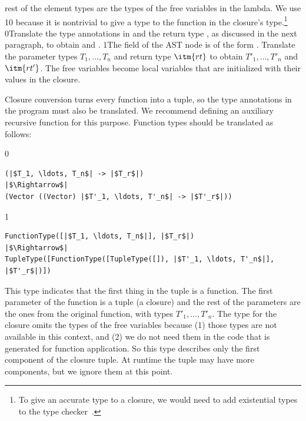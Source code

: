 \documentclass[7x10]{TimesAPriori_MIT}%
\def\racketEd{0}
\def\pythonEd{1}
\providecommand{\BookEdition}{1}
\let\edition\BookEdition
\newcommand{\racket}[1]{{\if\edition\racketEd{#1}\fi}}
\newcommand{\pythonColor}[0]{}
\newcommand{\python}[1]{{\if\edition\pythonEd\pythonColor #1\fi}}
\numberwithin{theorem}{chapter}
\numberwithin{definition}{chapter}
\numberwithin{equation}{chapter}
\begin{document}
rest of the element types are the types of the free variables in the
lambda. We use \python{}\racket{\code{\_}} because it
is nontrivial to give a type to the function in the closure's
type.\footnote{To give an accurate type to a closure, we would need to
  add existential types to the type checker~\citep{Minamide:1996ys}.}
%
\racket{Translate the type
  annotations in  and the return type \itm{rt}, as discussed in
  the next paragraph, to obtain \itm{ps'} and \itm{rt'}.}%
\python{The  field of the  AST node
  is of the form \code{FunctionType([$x_1:T_1,\ldots, x_n:T_n$], $rt$)}.
  Translate the parameter types $T_1,\ldots,T_n$ and return type $\itm{rt}$
  to obtain $T'_1,\ldots, T'_n$ and $\itm{rt'}$.}
The free variables become local variables that are initialized with
their values in the closure.

Closure conversion turns every function into a tuple, so the type
annotations in the program must also be translated.  We recommend
defining an auxiliary recursive function for this purpose.  Function
types should be translated as follows:
%
{\if\edition\racketEd
\begin{lstlisting}
(|$T_1, \ldots, T_n$| -> |$T_r$|)
|$\Rightarrow$|  
(Vector ((Vector) |$T'_1, \ldots, T'_n$| -> |$T'_r$|))
\end{lstlisting}
\fi}
{\if\edition\pythonEd\pythonColor
\begin{lstlisting}
FunctionType([|$T_1, \ldots, T_n$|], |$T_r$|)
|$\Rightarrow$|  
TupleType([FunctionType([TupleType([]), |$T'_1, \ldots, T'_n$|], |$T'_r$|)])
\end{lstlisting}
\fi}
%
This type indicates that the first thing in the tuple is a
function. The first parameter of the function is a tuple (a closure)
and the rest of the parameters are the ones from the original
function, with types $T'_1, \ldots, T'_n$.  The type for the closure
omits the types of the free variables because (1) those types are not
available in this context, and (2) we do not need them in the code that
is generated for function application. So this type describes only the
first component of the closure tuple. At runtime the tuple may have
more components, but we ignore them at this point.
\end{document}
